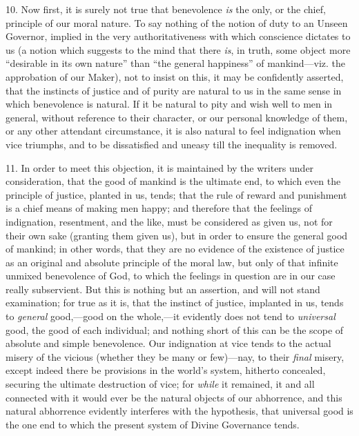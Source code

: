 10. Now first, it is surely not true that benevolence \emph{is} the
only, or the chief, principle of our moral nature. To say nothing of
the notion of duty to an Unseen Governor, implied in the very
authoritativeness with which conscience dictates to us (a notion which
suggests to the mind that there \emph{is}, in truth, some object more
``desirable in its own nature'' than ``the general
happiness'' of mankind—viz. the approbation of our Maker), not
to insist on this, it may be confidently asserted, that the instincts
of justice and of purity are natural to us in the same sense in which
benevolence is natural. If it be natural to pity and wish well to men
in general, without reference to their character, or our personal
knowledge of them, or any other attendant circumstance, it is also
natural to feel indignation when vice triumphs, and to be dissatisfied
and uneasy till the inequality is removed.

11. In order to meet this objection, it is maintained by the
writers under consideration, that the good of mankind is the ultimate
end, to which even the principle of justice, planted in us, tends;
that the rule of reward and punishment is a chief means of making men
happy; and therefore that the feelings of indignation, resentment, and
the like, must be considered as given us, not for their own sake
(granting them given us), but in order to ensure the general good of
mankind; in other words, that they are no evidence of the existence of
justice as an original and absolute principle of the moral law, but
only of that infinite unmixed benevolence of God, to which the
feelings in question are in our case really subservient. But this is
nothing but an assertion, and will not stand examination; for true as
it is, that the instinct of justice, implanted in us, tends to \emph{general}
good,—good on the whole,—it evidently does not tend to \emph{universal}
good, the good of each individual; and nothing short of this can be
the scope of absolute and simple benevolence. Our indignation at vice
tends to the actual misery of the vicious (whether they be many or
few)—nay, to their \emph{final} misery, except indeed there be provisions
in the world's system, hitherto concealed, securing the ultimate
destruction of vice; for \emph{while} it remained, it and all connected with
it would ever be the natural objects of our abhorrence, and this
natural abhorrence evidently interferes with the hypothesis, that
universal good is the one end to which the present system of Divine
Governance tends.

